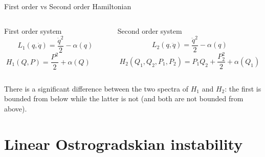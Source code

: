 \documentclass[10pt]{beamer}
\begin{document}
  \begin{frame}{First order vs Second order Hamiltonian}
    \vspace{0.5em}
    \begin{columns}
      \begin{column}{0.5\textwidth}
        \begin{center}
          \alert{First order system} \vspace{0.1em}
          \begin{equation*}
            L_1(q, \dot{q}) = \frac{\dot{q}^2}{2} - \alpha(q)
          \end{equation*}
          \begin{equation*} \label{eq: first-order_motion_eq_ham}
            H_1(Q, P) = \frac{P^2}{2} + \alpha(Q) \qquad
          \end{equation*}
        \end{center}
      \end{column}
      \begin{column}{0.5\textwidth}
        \begin{center}
          \alert{Second order system} \vspace{0.1em}
          \begin{equation*}
            L_2(q, \ddot{q}) = \frac{\ddot{q}^2}{2} - \alpha(q)
          \end{equation*}
          \begin{equation*} \label{eq: second-order_motion_eq_ham}
            H_2(Q_1, Q_2, P_1, P_2) = P_1Q_2 + \frac{P_2^2}{2} + \alpha(Q_1)
          \end{equation*}
        \end{center}
      \end{column}
    \end{columns}
    \vspace{2.0em}
    There is a significant difference between the two spectra of $H_1$ and
    $H_2$: the first is bounded from below while the latter is not (and both are
    not bounded from above).
  \end{frame}

  \section{Linear Ostrogradskian instability}
\end{document}

